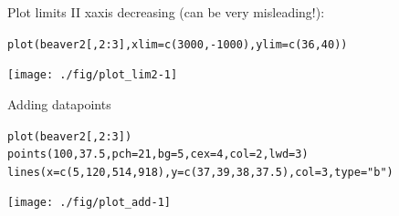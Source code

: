 \documentclass[xcolor=table,       handout,    xcolor=dvipsnames]{beamer}\usepackage[]{graphicx}\usepackage[]{color}
\makeatletter
\newcommand{\hlnum}[1]{\textcolor[rgb]{0,0,0}{#1}}
\newcommand{\hlstr}[1]{\textcolor[rgb]{0.545,0.137,0.137}{#1}}
\newcommand{\hlopt}[1]{\textcolor[rgb]{0,0,0}{#1}}
\newcommand{\hlstd}[1]{\textcolor[rgb]{0,0,0}{#1}}
\newcommand{\hlkwc}[1]{\textcolor[rgb]{1,0,1}{#1}}
\newcommand{\hlkwd}[1]{\textcolor[rgb]{0,0,1}{#1}}
\newenvironment{kframe}{%
 \def\at@end@of@kframe{}%
 \ifinner\ifhmode%
  \def\at@end@of@kframe{\end{minipage}}%
  \begin{minipage}{\columnwidth}%
 \fi\fi%
 \def\FrameCommand##1{\hskip\@totalleftmargin \hskip-\fboxsep
 \colorbox{shadecolor}{##1}\hskip-\fboxsep
     \hskip-\linewidth \hskip-\@totalleftmargin \hskip\columnwidth}%
 \MakeFramed {\advance\hsize-\width
   \@totalleftmargin\z@ \linewidth\hsize
   \@setminipage}}%
 {\par\unskip\endMakeFramed%
 \at@end@of@kframe}
\newenvironment{knitrout}{}{} %
\makeatother
\begin{document}

\begin{frame}[fragile]{Plot limits II}
xaxis decreasing (can be very misleading!):
\begin{knitrout}
\color{fgcolor}\begin{kframe}
\begin{alltt}
\hlkwd{plot}\hlstd{(beaver2[ ,}\hlnum{2}\hlopt{:}\hlnum{3}\hlstd{],} \hlkwc{xlim}\hlstd{=}\hlkwd{c}\hlstd{(}\hlnum{3000}\hlstd{,}\hlopt{-}\hlnum{1000}\hlstd{),} \hlkwc{ylim}\hlstd{=}\hlkwd{c}\hlstd{(}\hlnum{36}\hlstd{,}\hlnum{40}\hlstd{))}
\end{alltt}
\end{kframe}

{\centering \texttt{[image: ./fig/plot\_lim2-1]} 

}



\end{knitrout}
\end{frame}


\begin{frame}[fragile]{Adding datapoints}
\begin{knitrout}\scriptsize
{}\color{fgcolor}\begin{kframe}
\begin{alltt}
\hlkwd{plot}\hlstd{(beaver2[ ,}\hlnum{2}\hlopt{:}\hlnum{3}\hlstd{])}
\hlkwd{points}\hlstd{(}\hlnum{100}\hlstd{,} \hlnum{37.5}\hlstd{,} \hlkwc{pch}\hlstd{=}\hlnum{21}\hlstd{,} \hlkwc{bg}\hlstd{=}\hlnum{5}\hlstd{,} \hlkwc{cex}\hlstd{=}\hlnum{4}\hlstd{,} \hlkwc{col}\hlstd{=}\hlnum{2}\hlstd{,} \hlkwc{lwd}\hlstd{=}\hlnum{3}\hlstd{)}
\hlkwd{lines}\hlstd{(}\hlkwc{x}\hlstd{=}\hlkwd{c}\hlstd{(}\hlnum{5}\hlstd{,}\hlnum{120}\hlstd{,}\hlnum{514}\hlstd{,}\hlnum{918}\hlstd{),} \hlkwc{y}\hlstd{=}\hlkwd{c}\hlstd{(}\hlnum{37}\hlstd{,}\hlnum{39}\hlstd{,}\hlnum{38}\hlstd{,}\hlnum{37.5}\hlstd{),} \hlkwc{col}\hlstd{=}\hlnum{3}\hlstd{,} \hlkwc{type}\hlstd{=}\hlstr{"b"}\hlstd{)}
\end{alltt}
\end{kframe}

{\centering \texttt{[image: ./fig/plot\_add-1]} 

}



\end{knitrout}
\end{frame}
\end{document}
